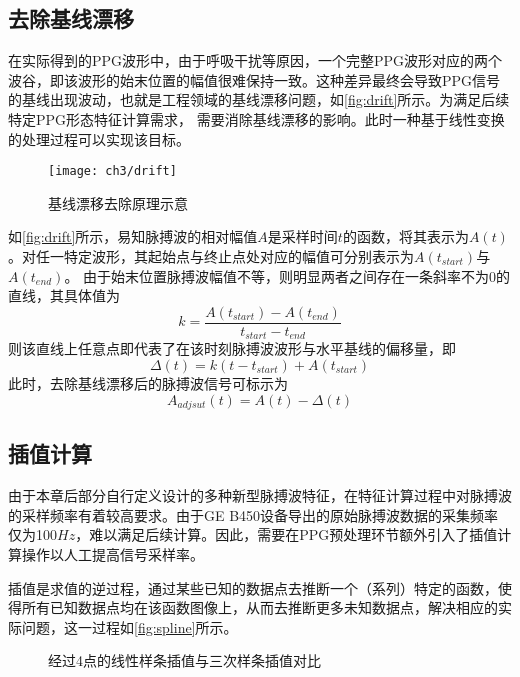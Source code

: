 \subsection{去除基线漂移}
在实际得到的PPG波形中，由于呼吸干扰等原因，一个完整PPG波形对应的两个波谷，即该波形的始末位置的幅值很难保持一致。这种差异最终会导致PPG信号的基线出现波动，也就是工程领域的基线漂移问题，如\autoref{fig:drift}所示。为满足后续特定PPG形态特征计算需求，
需要消除基线漂移的影响。此时一种基于线性变换的处理过程可以实现该目标。
\begin{figure}[htbp]
    \centering
    \texttt{[image: ch3/drift]}
    \caption{\label{fig:drift}基线漂移去除原理示意}
\end{figure}

如\autoref{fig:drift}所示，易知脉搏波的相对幅值$A$是采样时间$t$的函数，将其表示为$A(t)$。对任一特定波形，其起始点与终止点处对应的幅值可分别表示为$A(t_{start})$与$A(t_{end})$。
由于始末位置脉搏波幅值不等，则明显两者之间存在一条斜率不为0的直线，其具体值为
\begin{equation}
    \label{equ:linek}
    k=\frac{A(t_{start})-A(t_{end})}{t_{start}-t_{end}}
\end{equation}
则该直线上任意点即代表了在该时刻脉搏波波形与水平基线的偏移量，即
\begin{equation}
    \label{equ:liney}
    \Delta(t)=k(t-t_{start})+A(t_{start})
\end{equation}
此时，去除基线漂移后的脉搏波信号可标示为
\begin{equation}
    \label{equ:adjusta}
    A_{adjsut}(t)=A(t)-\Delta(t)
\end{equation}

\subsection{插值计算}
由于本章后部分自行定义设计的多种新型脉搏波特征，在特征计算过程中对脉搏波的采样频率有着较高要求。由于GE B450设备导出的原始脉搏波数据的采集频率仅为100$Hz$，难以满足后续计算。因此，需要在PPG预处理环节额外引入了插值计算操作以人工提高信号采样率。

插值是求值的逆过程，通过某些已知的数据点去推断一个（系列）特定的函数，使得所有已知数据点均在该函数图像上，从而去推断更多未知数据点，解决相应的实际问题，这一过程如\autoref{fig:spline}所示。
\begin{figure}[htbp]
    \centering
    \quad
    \caption{\label{fig:spline}经过4点的线性样条插值与三次样条插值对比}
\end{figure}

